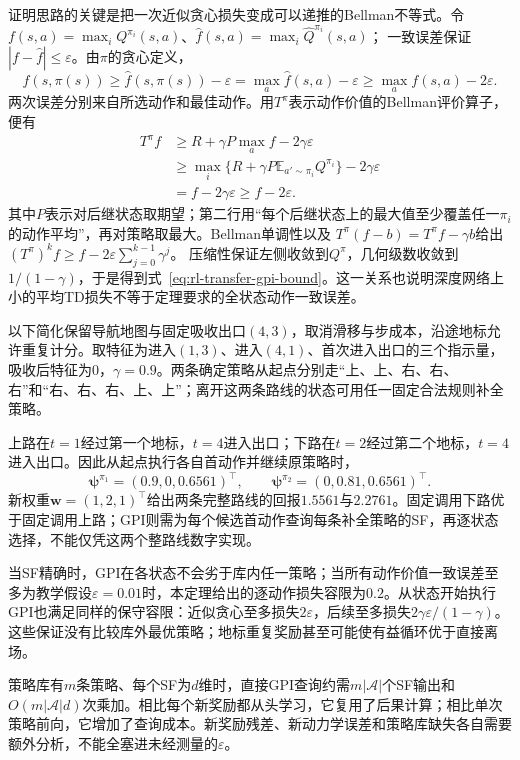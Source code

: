 证明思路的关键是把一次近似贪心损失变成可以递推的Bellman不等式。令
$f(s,a)=\max_iQ^{\pi_i}(s,a)$、$\widehat f(s,a)=\max_i\widehat Q^{\pi_i}(s,a)$；
一致误差保证$|f-\widehat f|\leq\varepsilon$。由$\pi$的贪心定义，
\[
 f(s,\pi(s))\geq\widehat f(s,\pi(s))-\varepsilon
 =\max_a\widehat f(s,a)-\varepsilon
 \geq\max_a f(s,a)-2\varepsilon.
\]
两次误差分别来自所选动作和最佳动作。用$T^\pi$表示动作价值的Bellman评价算子，便有
\begin{align*}
 T^\pi f
 &\geq R+\gamma P\max_a f-2\gamma\varepsilon\\
 &\geq \max_i\{R+\gamma P\mathbb E_{a'\sim\pi_i}Q^{\pi_i}\}
           -2\gamma\varepsilon\\
 &=f-2\gamma\varepsilon\geq f-2\varepsilon.
\end{align*}
其中$P$表示对后继状态取期望；第二行用“每个后继状态上的最大值至少覆盖任一$\pi_i$的动作平均”，再对策略取最大。Bellman单调性以及
$T^\pi(f-b)=T^\pi f-\gamma b$给出
$(T^\pi)^k f\geq f-2\varepsilon\sum_{j=0}^{k-1}\gamma^j$。
压缩性保证左侧收敛到$Q^\pi$，几何级数收敛到$1/(1-\gamma)$，于是得到式~\eqref{eq:rl-transfer-gpi-bound}。这一关系也说明深度网络上小的平均TD损失不等于定理要求的全状态动作一致误差。

\begin{example}[两条绕障策略的新奖励评价]
 \label{ex:rl-transfer-sf-routes}
 以下简化保留导航地图与固定吸收出口$(4,3)$，取消滑移与步成本，沿途地标允许重复计分。取特征为进入$(1,3)$、进入$(4,1)$、首次进入出口的三个指示量，吸收后特征为0，$\gamma=0.9$。两条确定策略从起点分别走“上、上、右、右、右”和“右、右、右、上、上”；离开这两条路线的状态可用任一固定合法规则补全策略。

 上路在$t=1$经过第一个地标，$t=4$进入出口；下路在$t=2$经过第二个地标，$t=4$进入出口。因此从起点执行各自首动作并继续原策略时，
 \[
 \bm\psi^{\pi_1}=(0.9,0,0.6561)^\top,\qquad
 \bm\psi^{\pi_2}=(0,0.81,0.6561)^\top.
 \]
 新权重$\bm w=(1,2,1)^\top$给出两条完整路线的回报$1.5561$与$2.2761$。固定调用下路优于固定调用上路；GPI则需为每个候选首动作查询每条补全策略的SF，再逐状态选择，不能仅凭这两个整路线数字实现。

 当SF精确时，GPI在各状态不会劣于库内任一策略；当所有动作价值一致误差至多为教学假设$\varepsilon=0.01$时，本定理给出的逐动作损失容限为$0.2$。从状态开始执行GPI也满足同样的保守容限：近似贪心至多损失$2\varepsilon$，后续至多损失$2\gamma\varepsilon/(1-\gamma)$。这些保证没有比较库外最优策略；地标重复奖励甚至可能使有益循环优于直接离场。
\end{example}

策略库有$m$条策略、每个SF为$d$维时，直接GPI查询约需$m|\mathcal A|$个SF输出和$O(m|\mathcal A|d)$次乘加。相比每个新奖励都从头学习，它复用了后果计算；相比单次策略前向，它增加了查询成本。新奖励残差、新动力学误差和策略库缺失各自需要额外分析，不能全塞进未经测量的$\varepsilon$。

